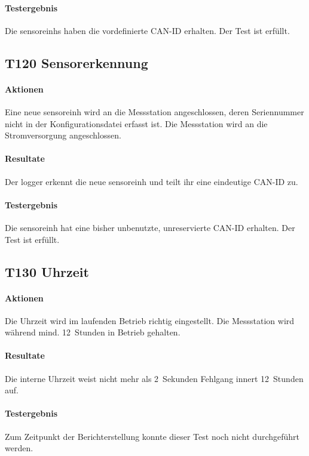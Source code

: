 \paragraph{Testergebnis} Die \glspl{sensoreinh} haben die vordefinierte CAN-ID erhalten. Der Test ist erfüllt.

\subsection{T120 Sensorerkennung}
\paragraph{Aktionen} Eine neue \gls{sensoreinh} wird an die Messstation angeschlossen, deren Seriennummer nicht in der Konfigurationsdatei erfasst ist. Die Messstation wird an die Stromversorgung angeschlossen.

\paragraph{Resultate} Der \gls{logger} erkennt die neue \gls{sensoreinh} und teilt ihr eine eindeutige CAN-ID zu.

\paragraph{Testergebnis} Die \gls{sensoreinh} hat eine bisher unbenutzte, unreservierte CAN-ID erhalten. Der Test ist erfüllt.

\subsection{T130 Uhrzeit}
\paragraph{Aktionen} Die Uhrzeit wird im laufenden Betrieb richtig eingestellt. Die Messstation wird während mind. 12~Stunden in Betrieb gehalten.

\paragraph{Resultate} Die interne Uhrzeit weist nicht mehr als 2~Sekunden Fehlgang innert 12~Stunden auf.

\paragraph{Testergebnis} Zum Zeitpunkt der Berichterstellung konnte dieser Test noch nicht durchgeführt werden. 

